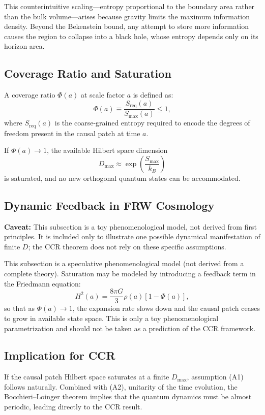 \documentclass[12pt]{article}
\newcommand{\Smax}{S_{\max}}
\theoremstyle{remark}
\begin{document}
This counterintuitive scaling---entropy proportional to the boundary area rather than the bulk volume---arises because gravity 
limits the maximum information density. Beyond the Bekenstein bound, any attempt to store more information causes the region 
to collapse into a black hole, whose entropy depends only on its horizon area.


\subsection{Coverage Ratio and Saturation}
A coverage ratio \(\Phi(a)\) at scale factor \(a\) is defined as:
\begin{equation}
\Phi(a) \equiv \frac{S_{\text{req}}(a)}{\Smax(a)} \le 1,
\end{equation}
where \(S_{\text{req}}(a)\) is the coarse-grained entropy required to encode the degrees of freedom present in the causal patch at time \(a\).

If \(\Phi(a) \to 1\), the available Hilbert space dimension
\begin{equation}
D_{\max} \approx \exp\left( \frac{\Smax}{k_B} \right)
\end{equation}
is saturated, and no new orthogonal quantum states can be accommodated.

\subsection{Dynamic Feedback in FRW Cosmology}
\textbf{Caveat:} This subsection is a toy phenomenological model, not derived from first principles. 
It is included only to illustrate one possible dynamical manifestation of finite $D$; 
the CCR theorem does not rely on these specific assumptions.

This subsection is a speculative phenomenological model (not derived from a complete theory). Saturation may be modeled by introducing a feedback term in the Friedmann equation:
\begin{equation}
H^2(a) = \frac{8\pi G}{3} \rho(a) \left[1 - \Phi(a)\right],
\end{equation}
so that as \(\Phi(a) \to 1\), the expansion rate slows down and the causal patch ceases to grow in available state space.
This is only a toy phenomenological parametrization and should not be taken as a prediction of the CCR framework.

\subsection{Implication for CCR}
If the causal patch Hilbert space saturates at a finite \(D_{\max}\), assumption (A1) follows naturally. Combined with (A2), unitarity of the time evolution, the Bocchieri--Loinger theorem implies that the quantum dynamics must be almost periodic, leading directly to the CCR result.
\end{document}
